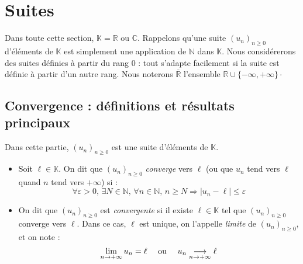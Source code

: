 \documentclass[french,11pt,twoside]{VcCours}
\begin{document}

\tableofcontents
\separationTitre

\newpage
\section{Suites}

Dans toute cette section, $\mathbb{K}= \mathbb{R}$ ou $\mathbb{C}$. Rappelons qu'une suite $(u_n)_{n \geq 0}$ d'éléments de $\mathbb{K}$ est simplement une application de $\mathbb{N}$ dans $\mathbb{K}$. Nous considérerons des suites définies à partir du rang $0$ : tout s'adapte facilement si la suite est définie à partir d'un autre rang. Nous noterons $\overline{\mathbb{R}}$ l'ensemble $\mathbb{R} \cup \lbrace - \infty, + \infty \rbrace\cdot$

\subsection{Convergence : définitions et résultats principaux}

Dans cette partie, $(u_n)_{ n \geq 0}$ est une suite d'éléments de $\mathbb{K}$.

\begin{TheoremeDefinition}{} 
\begin{itemize}
\item Soit $\ell \in \mathbb{K}$. On dit que $(u_n)_{n \geq 0}$ \emph{converge}
vers $\ell$ (ou que $u_n$ tend vers $\ell$ quand $n$ tend vers $+ \infty$) si :
$$ \forall \varepsilon>0, \, \exists N \in \mathbb{N}, \, \forall n \in \mathbb{N},
\, n \geq N \Rightarrow \vert u_n - \ell \vert \leq \varepsilon$$ 
\item On dit que $(u_n)_{n \geq 0}$ est \emph{convergente} si il existe 
$\ell \in \mathbb{K}$ tel que $(u_n)_{n \geq 0}$ converge vers $\ell$. 
Dans ce cas, $\ell$ est unique, on l'appelle \emph{limite} de $(u_n)_{n \geq 0}$, 
et on note :
$$ \lim_{ n \rightarrow + \infty} u_n = \ell \quad \hbox{ ou } \quad u_n 
\underset{n \rightarrow + \infty}{\longrightarrow} \ell$$
\end{itemize}
\end{TheoremeDefinition}{}
\end{document}
